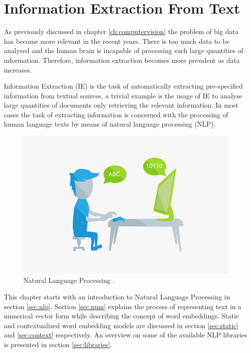 \cleardoublepage


\chapter{Information Extraction From Text}
\label{ch:nlp}

As previously discussed in chapter \ref{ch:computervision} the problem of big data has become more relevant in the recent years. There is too much data to be analysed and the human brain is incapable of processing such large quantities of information. Therefore, information extraction becomes more prevalent as data increases. 

Information Extraction (IE) is the task of automatically extracting pre-specified information from textual sources, a trivial example is the usage of IE to analyse large quantities of documents only retrieving the relevant information.
In most cases the task of extracting information is concerned with the processing of human language texts by means of natural language processing (NLP).


\begin{figure}[htb]
    \centering
    \includegraphics[scale = 0.55]{Sections/3StateOfTheArt/3_images/NaturalLanguageProcessing.png}
    \caption{Natural Language Processing \cite{rite_wiki}.}   
\end{figure}





This chapter starts with an introduction to Natural Language Processing in section \ref{sec:nlp}. Section \ref{sec:num} explains the process of representing text in a numerical vector form while describing the concept of word embeddings. Static and contextualized word embedding models are discussed in section \ref{sec:static} and \ref{sec:context} respectively. An overview on some of the available NLP libraries is presented in section \ref{sec:libraries}.

